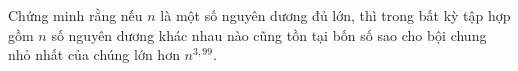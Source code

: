 \ifshowproblem
\begin{problem}\label{example:HUN-2015-TST-KMA-633}
    Chứng minh rằng nếu \( n \) là một số nguyên dương đủ lớn,
    thì trong bất kỳ tập hợp gồm \( n \) số nguyên dương khác nhau nào cũng tồn tại bốn số sao cho bội chung nhỏ nhất của chúng lớn hơn \( n^{3{,}99} \).
\end{problem}
\fi

\fi